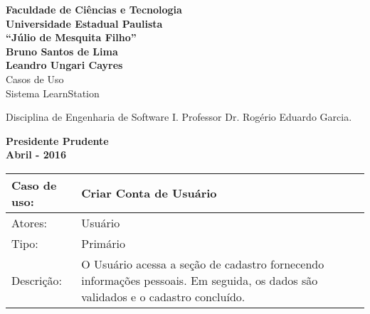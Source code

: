 \documentclass[12pt,a4paper,onecolumn,titlepage]{article}
\begin{document}

\begin{titlepage} %
	
	\vfill
	\begin{center}
	
		{\large \textbf{Faculdade de Ciências e Tecnologia\\Universidade Estadual Paulista\\``Júlio de Mesquita Filho''}} \\[3cm]
		{\large \textbf{Bruno Santos de Lima}}\\
		{\large \textbf{Leandro Ungari Cayres}}\\[4cm]
		{\Large Casos de Uso}\\
		{\Large Sistema LearnStation}\\[4cm]

	\hspace{.45\textwidth} %
	\begin{minipage}{.5\textwidth}
		\large Disciplina de Engenharia de Software I. Professor Dr. Rogério Eduardo Garcia.\\[0.5cm]
	\end{minipage}

	\vfill
	\vspace{1.5cm}
	
	\large \textbf{Presidente Prudente\\}
	\large \textbf{Abril - 2016}
	
	\end{center}
	
\end{titlepage}

\renewcommand{\baselinestretch}{1.5}

\begin{table}[h!]
\begin{center}
\begin{tabular}{p{2.5cm} p{9.5cm}}
Caso de uso: & \textbf{Criar Conta de Usuário} \\ \hline
Atores: & Usuário \\ \hline
Tipo: & Primário \\ \hline
Descrição: & O Usuário acessa a seção de cadastro fornecendo informações pessoais. Em seguida, os dados são validados e o cadastro concluído.

\end{tabular}
\end{center}
\end{table}
\end{document}
